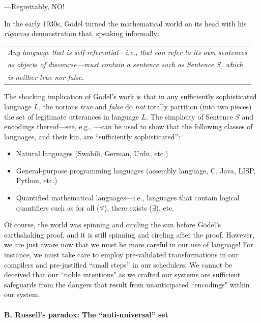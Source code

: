 \noindent
---Regrettably, NO!

\medskip

\noindent
In the early 1930s, G\"{o}del turned the mathematical world on its head with his {\em rigorous }demonstration that, speaking informally:

\smallskip

\begin{tabular}{l}
{\em Any language that is {\em self-referential}---i.e., that can refer to its own sentences} \\
{\em as objects of discourse---must contain a sentence such as Sentence $S$, which} \\
{\em is neither true nor false.}  \cite{Goedel31}
\end{tabular}

\bigskip

The shocking implication of G\"{o}del's work is that in any sufficiently sophisticated language $L$, the notions {\it true} and {\it false} do {\em not} totally partition (into two pieces) the set of legitimate utterances in language $L$.  The simplicity of Sentence $S$ and encodings thereof---see, e.g., \cite{Rosenberg09}---can be used to show that the following classes of languages, and their kin, are
``sufficiently sophisticated'':
\begin{itemize}
\item
Natural languages (Swahili, German, Urdu, etc.)
\medskip\item
General-purpose programming languages (assembly language, C, Java, LISP, Python, etc.)
\medskip\item
Quantified mathematical languages---i.e., languages that contain logical quantifiers such as {\sc for all} ($\forall$), {\sc there exists} ($\exists$), etc.
\end{itemize}

Of course, the world was spinning and circling the sun before G\"{o}del's earthshaking proof, and it is still spinning and circling after the proof.  However, we are just aware now that we must be more careful in our use of language!  For instance, we must take care to employ pre-validated transformations in our compilers and pre-justified ``small steps'' in our schedulers: We cannot be deceived that our ``noble intentions" as we crafted our systems are sufficient safeguards from the dangers that result from unanticipated ``encodings" within our system.


\paragraph{B.  Russell's paradox: The ``anti-universal'' set}

